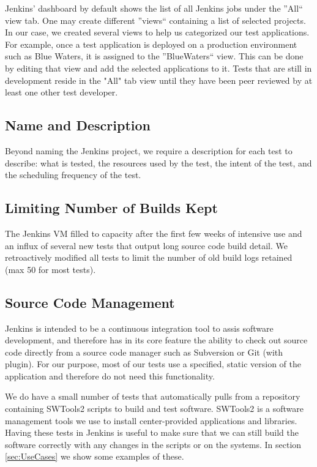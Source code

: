 \documentclass[10pt, conference, compsocconf]{IEEEtran}
\begin{document}
Jenkins' dashboard by default shows the list of all Jenkins jobs under the ''All`` view tab. 
One may create different ''views`` containing a list of selected projects. 
In our case, we created several views to help us categorized our test applications.
For example, once a test application is deployed on a production environment such as Blue Waters, it is assigned to the ''BlueWaters`` view. 
This can be done by editing that view and add the selected applications to it.
Tests that are still in development reside in the "All" tab view until they have been peer reviewed by at least one other test developer.

\subsection{Name and Description}
Beyond naming the Jenkins project, we require a description for each test to describe: what is tested, the resources used by the test, the intent of the test, and the scheduling frequency of the test.

\subsection{Limiting Number of Builds Kept}
The Jenkins VM filled to capacity after the first few weeks of intensive use and an influx of several new tests that output long source code build detail.
We retroactively modified all tests to limit the number of old build logs retained (max 50 for most tests). 

\subsection{Source Code Management}
Jenkins is intended to be a continuous integration tool to assis software development, and therefore has in its core feature the ability to check out source code directly from a source code manager such as Subversion or Git (with plugin).
For our purpose, most of our tests use a specified, static version of the application and therefore do not need this functionality. 

We do have a small number of tests that automatically pulls from a repository containing SWTools2 scripts to build and test software. 
SWTools2 is a software management tools we use to install center-provided applications and libraries. Having these tests in Jenkins is useful to make sure that we can still build the software correctly with any changes in the scripts or on the systems. 
In section \ref{sec:UseCases} we show some examples of these.
\end{document}
